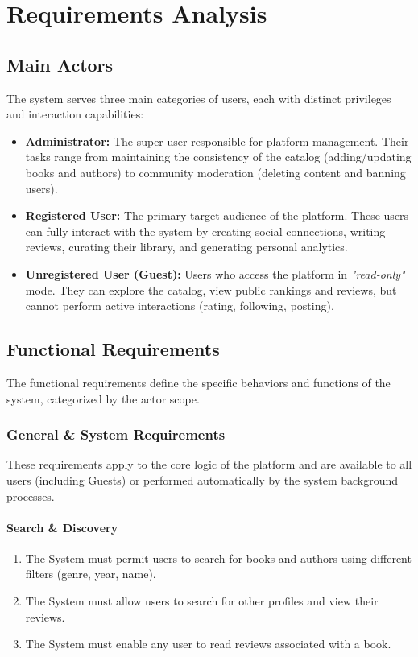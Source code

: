 \section{Requirements Analysis}
\subsection{Main Actors}
The system serves three main categories of users, each with distinct privileges and interaction capabilities:

\begin{itemize}
    \item \textbf{Administrator:} The super-user responsible for platform management. Their tasks range from maintaining the consistency of the catalog (adding/updating books and authors) to community moderation (deleting content and banning users).
    \item \textbf{Registered User:} The primary target audience of the platform. These users can fully interact with the system by creating social connections, writing reviews, curating their library, and generating personal analytics.
    \item \textbf{Unregistered User (Guest):} Users who access the platform in \textit{"read-only"} mode. They can explore the catalog, view public rankings and reviews, but cannot perform active interactions (rating, following, posting).
\end{itemize}

\subsection{Functional Requirements}
The functional requirements define the specific behaviors and functions of the system, categorized by the actor scope.

\subsubsection{General \& System Requirements}
These requirements apply to the core logic of the platform and are available to all users (including Guests) or performed automatically by the system background processes.

\paragraph{Search \& Discovery}
\begin{enumerate}
    \item The System must permit users to search for books and authors using different filters (genre, year, name).
    \item The System must allow users to search for other profiles and view their reviews.
    \item The System must enable any user to read reviews associated with a book.
\end{enumerate}

